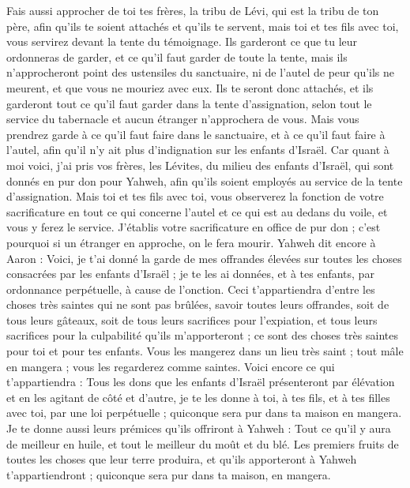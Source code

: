 \begin{multicols}{2}
Fais aussi approcher de toi tes frères, la tribu de Lévi, qui est la tribu de ton père, afin qu'ils te soient attachés et qu'ils te servent, mais toi et tes fils avec toi, vous servirez devant la tente du témoignage.
Ils garderont ce que tu leur ordonneras de garder, et ce qu'il faut garder de toute la tente, mais ils n'approcheront point des ustensiles du sanctuaire, ni de l'autel de peur qu'ils ne meurent, et que vous ne mouriez avec eux.
Ils te seront donc attachés, et ils garderont tout ce qu'il faut garder dans la tente d'assignation, selon tout le service du tabernacle et aucun étranger n'approchera de vous.
Mais vous prendrez garde à ce qu'il faut faire dans le sanctuaire, et à ce qu'il faut faire à l'autel, afin qu'il n'y ait plus d'indignation sur les enfants d'Israël.
Car quant à moi voici, j'ai pris vos frères, les Lévites, du milieu des enfants d'Israël, qui sont donnés en pur don pour Yahweh, afin qu'ils soient employés au service de la tente d'assignation.
Mais toi et tes fils avec toi, vous observerez la fonction de votre sacrificature en tout ce qui concerne l'autel et ce qui est au dedans du voile, et vous y ferez le service. J'établis votre sacrificature en office de pur don ; c'est pourquoi si un étranger en approche, on le fera mourir.
Yahweh dit encore à Aaron : Voici, je t'ai donné la garde de mes offrandes élevées sur toutes les choses consacrées par les enfants d'Israël ; je te les ai données, et à tes enfants, par ordonnance perpétuelle, à cause de l'onction.
Ceci t'appartiendra d'entre les choses très saintes qui ne sont pas brûlées, savoir toutes leurs offrandes, soit de tous leurs gâteaux, soit de tous leurs sacrifices pour l'expiation, et tous leurs sacrifices pour la culpabilité qu'ils m'apporteront ; ce sont des choses très saintes pour toi et pour tes enfants.
Vous les mangerez dans un lieu très saint ; tout mâle en mangera ; vous les regarderez comme saintes.
Voici encore ce qui t'appartiendra : Tous les dons que les enfants d'Israël présenteront par élévation et en les agitant de côté et d'autre, je te les donne à toi, à tes fils, et à tes filles avec toi, par une loi perpétuelle ; quiconque sera pur dans ta maison en mangera.
Je te donne aussi leurs prémices qu'ils offriront à Yahweh : Tout ce qu'il y aura de meilleur en huile, et tout le meilleur du moût et du blé.
Les premiers fruits de toutes les choses que leur terre produira, et qu'ils apporteront à Yahweh t'appartiendront ; quiconque sera pur dans ta maison, en mangera.

\end{multicols}
